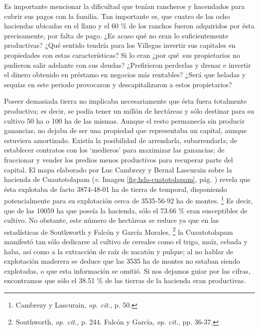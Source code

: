 \documentclass[14pt,twoside,final]{extbook} %
\let\oldfootnote\footnote
\renewcommand\footnote[1]{%
\oldfootnote{\hspace{1mm}#1}}
\begin{document}
Es importante mencionar la dificultad que tenían rancheros y hacendados para cubrir sus pagos con la familia. Tan importante es, que cuatro de las ocho haciendas ubicadas en el llano y el 60 \% de los ranchos fueron adquiridos por ésta precisamente, por falta de pago. ¿Es acaso qué no eran lo suficientemente productivas? ¿Qué sentido tendría para los Villegas invertir sus capitales en propiedades con estas características? Si lo eran ¿por qué~sus propietarios no pudieron salir adelante con sus deudas? ¿Prefirieron perderlas y drenar e invertir el dinero obtenido en préstamo en negocios más rentables? ¿Será que heladas y sequías en este periodo provocaron y descapitalizaron a estos propietarios?

Poseer demasiada tierra no implicaba necesariamente que ésta fuera totalmente productiva; es decir, se podía tener un millón de hectáreas y sólo destinar para su cultivo 50 ha o 100 ha de las mismas. Aunque el resto permanecía sin producir ganancias, no dejaba de ser una propiedad que representaba un capital, aunque estuviera amortizado. Existía la posibilidad de arrendarla, subarrendarla; de establecer contratos con los `medieros' para maximizar las ganancias; de fraccionar y vender los predios menos productivos para recuperar parte del capital. El mapa elaborado por Luc Cambrezy y Bernal Lascurain sobre la hacienda de Cuautotolapam (\emph{v.} Imagen \ref{fig:hda-cuatotolapam}, pág. \pageref{fig:hda-cuatotolapam}) revela que ésta explotaba de facto 3874-48-01 ha de tierra de temporal, disponiendo potencialmente para su explotación cerca de 3535-56-92 ha de montes.\footnote{Cambrezy y Lascurain, \emph{op. cit.}, p. 50.} Es decir, que de las 10059 ha que poseía la hacienda, sólo el 73.66 \% eran susceptibles de cultivo. No obstante, este número de hectáreas se reduce ya que en las estadísticas de Southworth y Falcón y García Morales,\footnote{Southworth, \emph{op. cit.}, p. 244. Falcón y García, \emph{op. cit.}, pp. 36-37.} la Cuautotolapam manifestó tan sólo dedicarse al cultivo de cereales como el trigo, maíz, cebada y haba, así como a la extracción de raíz de zacatón y pulque; al no hablar de explotación maderera se deduce que las 3535 ha de montes no estaban siendo explotadas, o que esta información se omitió. Si nos dejamos guiar por las cifras, encontramos que sólo el 38.51 \% de las tierras de la hacienda eran productivas.
\end{document}
